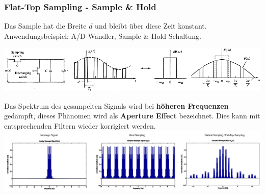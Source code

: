 \subsubsection{Flat-Top Sampling - Sample \& Hold}
Das Sample hat die Breite $d$ und bleibt über diese Zeit konstant. \\
Anwendungsbeispiel: A/D-Wandler, Sample \& Hold Schaltung. \\
	\begin{center}
		\includegraphics[width=17.5cm]{bilder/dig_flattopsampling.png}
	\end{center}
Das Spektrum des gesampelten Signals wird bei \textbf{höheren Frequenzen} gedämpft, dieses Phänomen
wird als \textbf{Aperture Effect} bezeichnet. Dies kann mit entsprechenden Filtern wieder
korrigiert werden.\\
\includegraphics[width=17.5cm]{bilder/dig_sampling_spec.png}
\\

 
